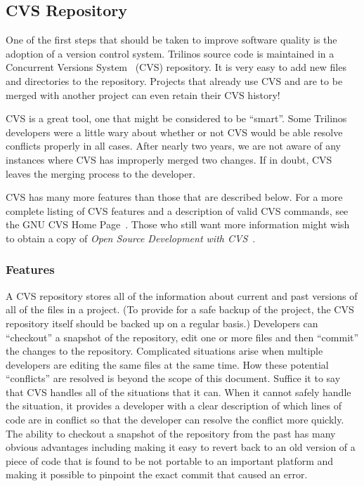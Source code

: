 \documentclass[12pt,relax]{article}
\begin{document}

\subsection{CVS Repository}

One of the first steps that should be taken to improve software quality is the 
adoption of a version control system.  Trilinos source code is maintained in a 
Concurrent Versions System~\cite{CVS}
(CVS) repository.  It is very easy to add new files and directories to
the repository.  Projects that already use CVS and are to be merged with 
another project can even retain their CVS history!

CVS is a great tool, one that might be considered to be ``smart''.  Some 
Trilinos developers were a little wary about whether or not CVS would be able
resolve conflicts properly in all cases.  After nearly two years, we are
not aware of any instances where CVS has improperly merged two changes.  If in 
doubt, CVS leaves the merging process to the developer.

CVS has many more features than those that are described below.  For a more 
complete listing of CVS features and a description of valid CVS commands, 
see the GNU CVS Home Page~\cite{CVS}.  Those who still want more information 
might wish to obtain a copy of 
{\it Open Source Development with CVS}~\cite{FogelBarCVS}.

\subsubsection{Features}

A CVS repository stores all of the information about current and past versions
of all of the files in a project.  (To provide for a safe backup of the 
project, the CVS repository itself should be backed up on a regular basis.)  
Developers can ``checkout'' a snapshot of 
the repository, edit one or more files and then ``commit'' the changes to the
repository.  Complicated situations arise when multiple developers are 
editing the same files at the same time.  How these potential ``conflicts'' 
are resolved is beyond the scope of this document.  Suffice it to say that 
CVS handles all of the situations that it can.  When it cannot safely handle 
the situation, it provides a developer with a clear description of which 
lines of code are in conflict so that the developer can resolve the 
conflict more quickly.  The ability to checkout a snapshot of the 
repository from the past has many obvious advantages including making it easy 
to revert back to an old version of a piece of code that is found to be not 
portable to an important platform and making it possible to pinpoint the exact 
commit that caused an error.
\end{document}
